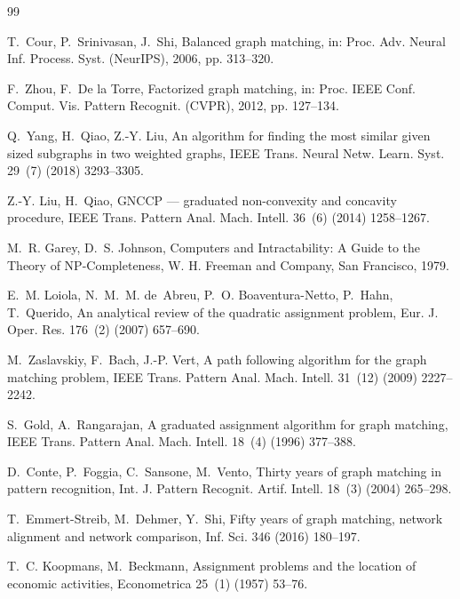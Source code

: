 \documentclass[a4paper,fleqn]{cas-dc}
\theoremstyle{thmstyleone}
\theoremstyle{thmstyletwo}
\theoremstyle{thmstylethree}
\begin{document}
\begin{thebibliography}{99}

T.~Cour, P.~Srinivasan, J.~Shi, Balanced graph matching, in: Proc. Adv. Neural Inf. Process. Syst. (NeurIPS), 2006, pp. 313--320.

F.~Zhou, F.~De la Torre, Factorized graph matching, in: Proc. IEEE Conf. Comput. Vis. Pattern Recognit. (CVPR), 2012, pp. 127--134.

Q.~Yang, H.~Qiao, Z.-Y. Liu, An algorithm for finding the most similar given sized subgraphs in two weighted graphs, IEEE Trans. Neural Netw. Learn. Syst. 29~(7) (2018) 3293--3305.

Z.-Y. Liu, H.~Qiao, {GNCCP} --- graduated non-convexity and concavity procedure, IEEE Trans. Pattern Anal. Mach. Intell. 36~(6) (2014) 1258--1267.

M.~R. Garey, D.~S. Johnson, Computers and Intractability: A Guide to the Theory of NP-Completeness, W. H. Freeman and Company, San Francisco, 1979.

E.~M. Loiola, N.~M.~M. de~Abreu, P.~O. Boaventura-Netto, P.~Hahn, T.~Querido, An analytical review of the quadratic assignment problem, Eur. J. Oper. Res. 176~(2) (2007) 657--690.

M.~Zaslavskiy, F.~Bach, J.-P. Vert, A path following algorithm for the graph matching problem, IEEE Trans. Pattern Anal. Mach. Intell. 31~(12) (2009) 2227--2242.

S.~Gold, A.~Rangarajan, A graduated assignment algorithm for graph matching, IEEE Trans. Pattern Anal. Mach. Intell. 18~(4) (1996) 377--388.

D.~Conte, P.~Foggia, C.~Sansone, M.~Vento, Thirty years of graph matching in pattern recognition, Int. J. Pattern Recognit. Artif. Intell. 18~(3) (2004) 265--298.

T.~Emmert-Streib, M.~Dehmer, Y.~Shi, Fifty years of graph matching, network alignment and network comparison, Inf. Sci. 346 (2016) 180--197.

T.~C. Koopmans, M.~Beckmann, Assignment problems and the location of economic activities, Econometrica 25~(1) (1957) 53--76.


\end{thebibliography}
\end{document}

